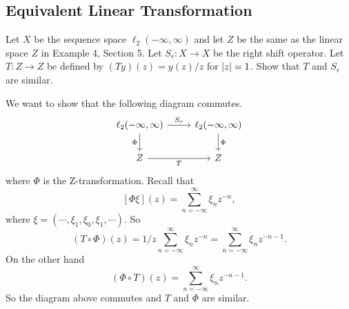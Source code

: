 \subsection{Equivalent Linear Transformation}
\begin{problem}
	Let $ X $ be the sequence space $ \ell_2(-\infty,\infty) $ and let $ Z $ be the same as the linear space $ Z $ in Example 4, Section 5. Let $ S_r: X\to X $ be the right shift operator. Let $ T:Z\to Z $ be defined by $ (Ty)(z) = y(z)/z $ for $ \left|z\right|=1 $. Show that $ T $ and $ S_r $ are similar.
\end{problem}
\begin{solution}
	We want to show that the following diagram commutes.
	\[\begin{tikzcd}
		{\ell_2(-\infty,\infty)} & {\ell_2(-\infty,\infty)} \\
		Z & Z
		\arrow["{S_r}", from=1-1, to=1-2]
		\arrow["\Phi"', from=1-1, to=2-1]
		\arrow["\Phi", from=1-2, to=2-2]
		\arrow["T"', from=2-1, to=2-2]
	\end{tikzcd}\]
	where $ \Phi $ is the Z-transformation. Recall that
	\[ [\Phi \xi](z) = \sum_{n=-\infty}^{\infty} \xi_n z^{-n}, \]
	where $ \xi = (\cdots,\xi_1,\xi_0,\xi_1,\cdots) $.
	So
	\[ (T\circ \Phi)(z) = 1/z \sum_{n=-\infty}^{\infty} \xi_n z^{-n} =  \sum_{n=-\infty}^{\infty} \xi_n z^{-n-1}. \]
	On the other hand 
	\[ (\Phi\circ T)(z) = \sum_{n=-\infty}^{\infty} \xi_n z^{-n-1}.  \]
	So the diagram above commutes and $ T $ and $ \Phi $ are similar.
\end{solution}

